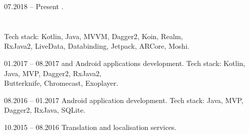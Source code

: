 \documentclass[12pt, a4paper]{article}
\newcommand{\midSectionSpace}{16pt}
\begin{document}
\begin{minipage}[t]{0.6\textwidth}
    
    \vspace{24pt}
    
    \begin{subsec}{}{07.2018 – Present}
        \>  .   \lineend
        \>          \\
        \>        \\
        \>             \\
        \>                \lineend
        \>  Tech stack: Kotlin, Java, MVVM,  Dagger2, Koin, Realm,   \\
        \>  RxJava2, LiveData, Databinding, Jetpack, ARCore, Moshi.  \\
    \end{subsec}
    
    \vspace{\midSectionSpace}
    
    \begin{subsec}{}{01.2017 – 08.2017}
        \>   and  Android applications development.   \lineend
        \>  Tech stack: Kotlin, Java, MVP, Dagger2, RxJava2,                                        \\
        \>  Butterknife, Chromecast, Exoplayer.                                                     \\
    \end{subsec}
    
    \vspace{\midSectionSpace}
    
    \begin{subsec}{}{08.2016 – 01.2017}
        \>   Android application development.    \lineend
        \>  Tech stack: Java, MVP, Dagger2, RxJava, SQLite.             \\
    \end{subsec}

    \vspace{\midSectionSpace}
    
    \begin{subsec}{}{10.2015 – 08.2016}
        \>  Translation and localisation services.  \\
        \>         \\
        \>          \\
    \end{subsec}


\end{minipage}
\end{document}
